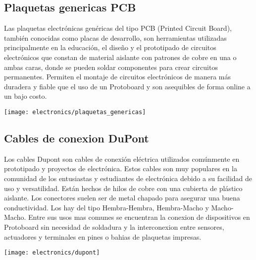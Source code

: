 \subsection{Plaquetas genericas PCB}
Las plaquetas electrónicas genéricas del tipo PCB (Printed Circuit Board), también conocidas como placas de desarrollo, son herramientas utilizadas principalmente en la educación, el diseño y el prototipado de circuitos electrónicos que constan de material aislante con patrones de cobre en una o ambas caras, donde se pueden soldar componentes para crear circuitos permanentes. Permiten el montaje de circuitos electrónicos de manera más duradera y fiable que el uso de un Protoboard y son asequibles de forma online a un bajo costo.

\begin{center}
    \centering
    \texttt{[image: electronics/plaquetas\_genericas]}
    \label{fig:plaquetas_genericas}
\end{center}


\subsection{Cables de conexion DuPont}
Los cables Dupont son cables de conexión eléctrica utilizados comúnmente en prototipado y proyectos de electrónica. Estos cables son muy populares en la comunidad de los entusiastas y estudiantes de electrónica debido a su facilidad de uso y versatilidad. Están hechos de hilos de cobre con una cubierta de plástico aislante. Los conectores suelen ser de metal chapado para asegurar una buena conductividad. Los hay del tipo Hembra-Hembra, Hembra-Macho y Macho-Macho. Entre sus usos mas comunes se encuentran la conexion de dispositivos en Protoboard sin necesidad de soldadura y la interconexion entre sensores, actuadores y terminales en pines o bahias de plaquetas impresas.

\begin{center}
    \centering
    \texttt{[image: electronics/dupont]}
    \label{fig:dupont}
\end{center}

